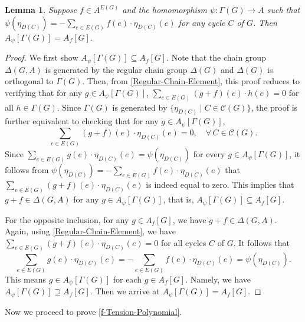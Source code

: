 \documentclass[12pt]{article}%
\numberwithin{equation}{section}
\newtheorem{lemma}[lemma]{Lemma}
\begin{document}
\begin{lemma}\label{A1=B1} Suppose  $f\in A^{E(G)}$ and the homomorphism $\psi:\Gamma(G)\to A$ such that $\psi(\eta_{D(C)})=-\sum_{e\in E(G)}f(e)\cdot\eta_{D(C)}(e)$ for any cycle $C$ of $G$. Then $A_\psi[\Gamma(G)]=A_f[G]$.
\end{lemma}
\begin{proof}
We first show $A_\psi[\Gamma(G)]\subseteq A_f[G]$. Note that the chain group $\Delta(G,A)$ is generated by the regular chain group $\Delta(G)$ and $\Delta(G)$ is orthogonal to $\Gamma(G)$. Then, from \eqref{Regular-Chain-Element}, this proof reduces to verifying that for any $g\in A_\psi[\Gamma(G)]$, $\sum_{e\in E(G)}(g+f)(e)\cdot h(e)=0$ for all $h\in \Gamma(G)$. Since $\Gamma(G)$ is generated by $\big\{\eta_{D(C)}\mid C\in\mathcal{C}(G)\big\}$, the proof  is further equivalent to checking that for any $g\in A_\psi[\Gamma(G)]$, 
\[
\sum_{e\in E(G)}(g+f)(e)\cdot \eta_{D(C)}(e)=0,\quad\forall\, C\in\mathcal{C}(G).
\]
Since $\sum_{e\in E(G)}g(e)\cdot \eta_{D(C)}(e)=\psi(\eta_{D(C)})$ for every $g\in A_\psi[\Gamma(G)]$, it follows from $\psi(\eta_{D(C)})=-\sum_{e\in E(G)}f(e)\cdot\eta_{D(C)}(e) $ that $\sum_{e\in E(G)}(g+f)(e)\cdot \eta_{D(C)}(e)$ is indeed equal to zero.  This implies that $g+f\in \Delta(G,A)$ for any $g\in A_\psi[\Gamma(G)]$, that is, $A_\psi[\Gamma(G)]\subseteq A_f[G]$.

For the opposite inclusion, for any $g\in A_f[G]$, we have $g+f\in\Delta(G,A)$. Again, using \eqref{Regular-Chain-Element}, we have $\sum_{e\in E(G)}(g+f)(e)\cdot \eta_{D(C)}(e)=0$ for all cycles $C$ of $G$. It follows that 
\[
\sum_{e\in E(G)}g(e)\cdot \eta_{D(C)}(e)=-\sum_{e\in E(G)}f(e)\cdot \eta_{D(C)}(e)=\psi( \eta_{D(C)}).
\]
This means $g\in A_\psi[\Gamma(G)]$ for each $g\in A_f[G]$. Namely, we have $A_\psi[\Gamma(G)]\supseteq A_f[G]$. Then we arrive at $A_\psi[\Gamma(G)]=A_f[G]$.
\end{proof}
Now we proceed to prove \autoref{f-Tension-Polynomial}.
\end{document}
